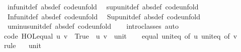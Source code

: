 \begin{isabellebody}
\ \ inf{\isacharunderscore}{\kern0pt}unit{\isacharunderscore}{\kern0pt}def\ {\isacharbrackleft}{\kern0pt}abs{\isacharunderscore}{\kern0pt}def{\isacharcomma}{\kern0pt}\ code{\isacharunderscore}{\kern0pt}unfold{\isacharbrackright}{\kern0pt}\isanewline
\ \ sup{\isacharunderscore}{\kern0pt}unit{\isacharunderscore}{\kern0pt}def\ {\isacharbrackleft}{\kern0pt}abs{\isacharunderscore}{\kern0pt}def{\isacharcomma}{\kern0pt}\ code{\isacharunderscore}{\kern0pt}unfold{\isacharbrackright}{\kern0pt}\isanewline
\ \ Inf{\isacharunderscore}{\kern0pt}unit{\isacharunderscore}{\kern0pt}def\ {\isacharbrackleft}{\kern0pt}abs{\isacharunderscore}{\kern0pt}def{\isacharcomma}{\kern0pt}\ code{\isacharunderscore}{\kern0pt}unfold{\isacharbrackright}{\kern0pt}\isanewline
\ \ Sup{\isacharunderscore}{\kern0pt}unit{\isacharunderscore}{\kern0pt}def\ {\isacharbrackleft}{\kern0pt}abs{\isacharunderscore}{\kern0pt}def{\isacharcomma}{\kern0pt}\ code{\isacharunderscore}{\kern0pt}unfold{\isacharbrackright}{\kern0pt}\isanewline
\ \ uminus{\isacharunderscore}{\kern0pt}unit{\isacharunderscore}{\kern0pt}def\ {\isacharbrackleft}{\kern0pt}abs{\isacharunderscore}{\kern0pt}def{\isacharcomma}{\kern0pt}\ code{\isacharunderscore}{\kern0pt}unfold{\isacharbrackright}{\kern0pt}\isanewline
\isanewline
{}\isamarkupfalse%
\isanewline
%
\isadelimproof
\ \ %
\endisadelimproof
%
\isatagproof
{}\isamarkupfalse%
\ intro{\isacharunderscore}{\kern0pt}classes\ auto%
\endisatagproof
{\isafoldproof}%
%
\isadelimproof
\isanewline
%
\endisadelimproof
\isanewline
{}\isamarkupfalse%
\isanewline
\isanewline
{}\isamarkupfalse%
\ {\isacharbrackleft}{\kern0pt}code{\isacharbrackright}{\kern0pt}{\isacharcolon}{\kern0pt}\ {\isachardoublequoteopen}HOL{\isachardot}{\kern0pt}equal\ u\ v\ {\isasymlongleftrightarrow}\ True{\isachardoublequoteclose}\ \ u\ v\ {\isacharcolon}{\kern0pt}{\isacharcolon}{\kern0pt}\ unit\isanewline
%
\isadelimproof
\ \ %
\endisadelimproof
%
\isatagproof
{}\isamarkupfalse%
\ equal\ unit{\isacharunderscore}{\kern0pt}eq\ {\isacharbrackleft}{\kern0pt}of\ u{\isacharbrackright}{\kern0pt}\ unit{\isacharunderscore}{\kern0pt}eq\ {\isacharbrackleft}{\kern0pt}of\ v{\isacharbrackright}{\kern0pt}\ \isamarkupfalse%
\ rule{\isacharplus}{\kern0pt}%
\endisatagproof
{\isafoldproof}%
%
\isadelimproof
\isanewline
%
\endisadelimproof
\isanewline
{}\isamarkupfalse%
\isanewline
\ \ \ unit\ {\isasymrightharpoonup}\isanewline

\end{isabellebody}
